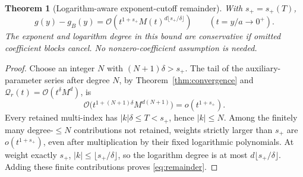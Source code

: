 \documentclass[11pt,a4paper]{article}
\newcommand{\OO}{\mathcal O}
\newtheorem{theorem}{Theorem}[section]
\theoremstyle{definition}
\begin{document}
\begin{theorem}[Logarithm-aware exponent-cutoff remainder]
\label{thm:remainder}
With \(s_+=s_+(T)\),
\begin{equation}\label{eq:remainder}
 g(y)-g_B(y)=
 \OO\left(t^{1+s_+}M(t)^{d\lfloor s_+/\delta\rfloor}\right)
 \qquad(t=y/a\to0^+).
\end{equation}
The exponent and logarithm degree in this bound are conservative if omitted
coefficient blocks cancel. No nonzero-coefficient assumption is needed.
\end{theorem}
\begin{proof}
Choose an integer \(N\) with \((N+1)\delta>s_+\).
The tail of the auxiliary-parameter series after degree \(N\), by
Theorem~\ref{thm:convergence} and \(\mathcal Q_r(t)=\OO(t^\delta M^d)\), is
\[
 \OO\bigl(t^{1+(N+1)\delta}M^{d(N+1)}\bigr)
 =o(t^{1+s_+}).
\]
Every retained multi-index has \(|k|\delta\le T<s_+\), hence \(|k|\le N\).
Among the finitely many degree-\(\le N\) contributions not retained, weights
strictly larger than \(s_+\) are \(o(t^{1+s_+})\), even after multiplication
by their fixed logarithmic polynomials. At weight exactly \(s_+\),
\(|k|\le\lfloor s_+/\delta\rfloor\), so the logarithm degree is at most
\(d\lfloor s_+/\delta\rfloor\). Adding these finite contributions proves
\eqref{eq:remainder}.
\end{proof}
\end{document}
